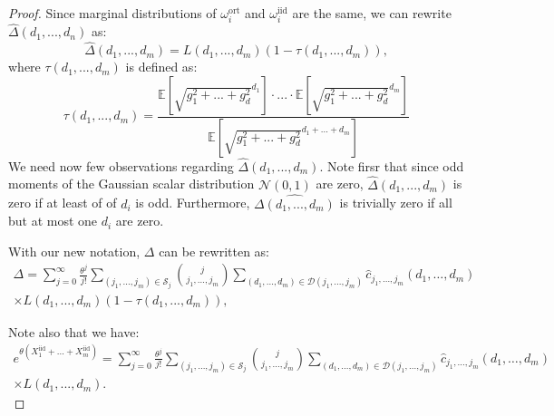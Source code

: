 \begin{proof}
Since marginal distributions of $\omega_{i}^{\mathrm{ort}}$ and $\omega_{i}^{\mathrm{iid}}$ are the same, we can rewrite $\widehat{\Delta}(d_{1},...,d_{n})$ as:
\begin{equation}
\widehat{\Delta}(d_{1},...,d_{m})=
L(d_{1},...,d_{m})(1 - \tau(d_{1},...,d_{m})),
\end{equation}
where $\tau(d_{1},...,d_{m})$ is defined as:
\begin{equation}
\tau(d_{1},...,d_{m}) = \frac{\mathbb{E}[\sqrt{g_{1}^{2}+...+g_{d}^{2}}^{d_{1}}] \cdot ...\cdot \mathbb{E}[\sqrt{g_{1}^{2}+...+g_{d}^{2}}^{d_{m}}]}
{\mathbb{E}[\sqrt{g_{1}^{2}+...+g_{d}^{2}}^{d_{1}+...+d_{m}}]}    \label{eq:taudef} 
\end{equation}
We need now few observations regarding $\widehat{\Delta}(d_{1},...,d_{m})$.
Note firsr that since odd moments of the Gaussian scalar distribution $\mathcal{N}(0, 1)$ are zero, $\widehat{\Delta}(d_{1},...,d_{m})$ is zero if at least of of $d_{i}$ is odd. Furthermore, $\widehat{\Delta(d_{1},...,d_{m})}$ is trivially zero if all but at most one $d_{i}$ are zero.

With our new notation, $\Delta$ can be rewritten as:
\begin{gather*}
\Delta = \sum_{j=0}^{\infty} \frac{\theta^{j}}{j!} \sum_{(j_{1},...,j_{m}) \in \mathcal{S}_{j}} \binom{j}{j_{1},\dots,j_{m}} \sum_{(d_{1},...,d_{m}) \in \mathcal{D}(j_{1},...,j_{m})} \widehat{c}_{j_1, \dots, j_m}(d_{1},\dots,d_{m}) \\
\times L(d_{1},...,d_{m})(1-\tau(d_{1},...,d_{m})),
\end{gather*}

Note also that we have:
\begin{gather*}
e^{\theta(X_{1}^{\mathrm{iid}}+...+X_{m}^{\mathrm{iid}})} = \sum_{j=0}^{\infty} \frac{\theta^{j}}{j!} \sum_{(j_{1},...,j_{m}) \in \mathcal{S}_{j}} \binom{j}{j_{1},\dots,j_{m}} \sum_{(d_{1},...,d_{m}) \in \mathcal{D}(j_{1},...,j_{m})} \widehat{c}_{j_1, \dots, j_m}(d_{1},\dots,d_{m}) \\
\times  L(d_{1},...,d_{m}).
\end{gather*}


\end{proof}
